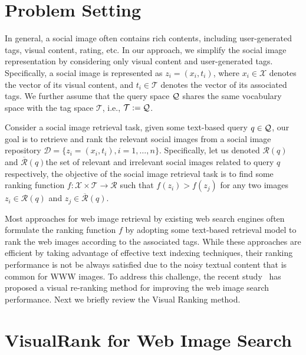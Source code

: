 \section{Problem Setting} \label{sec:rerank-framework}

In general, a social image often contains rich contents, including user-generated tags, visual content, rating, etc. In our approach, we simplify the social image representation by considering only visual content and user-generated tags. Specifically, a social image is represented as $z_i=(x_i,t_i)$, where $x_i\in\mathcal{X}$ denotes the vector of its visual content, and $t_i\in\mathcal{T}$ denotes the vector of its associated tags. We further assume that the query space ${\cal Q}$ shares the same vocabulary space with the tag space $\mathcal{T}$, i.e., ${\cal T} :={\cal Q}$.

Consider a social image retrieval task, given some text-based query $q\in{\cal Q}$, our goal is to retrieve and rank the relevant social images from a social image repository $\mathcal{D}=\{z_i=(x_i,t_i),i=1,\ldots,n\}$. Specifically, let us denoted $\mathcal{R}(q)$ and $\overline{\mathcal{R}}(q)$the set of relevant and irrelevant social images related to query $q$ respectively, the objective of the social image retrieval task is to find some ranking function $f:\mathcal{X}\times\mathcal{T}\rightarrow\mathcal{R}$ such that $f(z_i)>f(z_j)$ for any two images $z_i\in\mathcal{R}(q)$ and $z_j\in\overline{\mathcal{R}}(q)$.

Most approaches for web image retrieval by existing web search engines often formulate the ranking function $f$ by adopting some text-based retrieval model to rank the web images according to the associated tags. While these approaches are efficient by taking advantage of effective text indexing techniques, their ranking performance is not be always satisfied due to the noisy textual content that is common for WWW images. To address this challenge, the recent study~\cite{pami/JingB08} has proposed a visual re-ranking method for improving the web image search performance. Next we briefly review the Visual Ranking method.

\section{VisualRank for Web Image Search}

